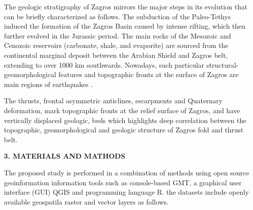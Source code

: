 \documentclass[12pt,a4paper,oneside]{article}
\def \newsection{\vspace{12pt}\textbf}
\begin{document}
The geologic stratigraphy of Zagros mirrors the major steps in its evolution that can be briefly characterized as follows. The subduction of the Paleo-Tethys induced the formation of the Zagros Basin caused by intense rifting, which then further evolved in the Jurassic period. The main rocks of the Mesozoic and Cenozoic reservoirs (carbonate, shale, and evaporite) are sourced from the continental marginal deposit between the Arabian Shield and Zagros belt, extending to over 1000 km southwards. Nowadays, such particular structural-geomorphological features and topographic fronts at the surface of Zagros are main regions of earthquakes \cite{Berberian}. 

The thrusts, frontal asymmetric anticlines, escarpments and Quaternary deformation, mark topographic fronts at the relief surface of Zagros, and have vertically displaced geologic, beds which highlights deep correlation between the topographic, geomorphological and geologic structure of Zagros fold and thrust belt.

\newsection{3. MATERIALS AND MATHODS}

The proposed study is performed in a combination of methods using open source geoinformation information tools such as console-based GMT, a graphical user interface (GUI) QGIS and programming language R. the datasets include openly available geospatila raster and vector layers as follows. 
\end{document}
